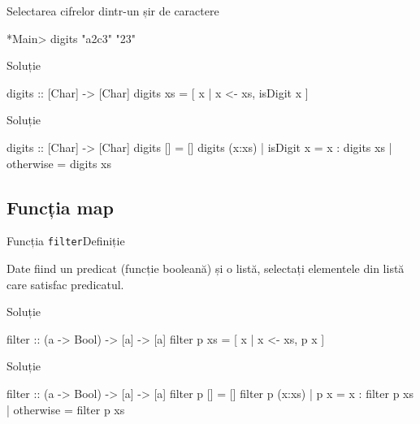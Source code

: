 \documentclass[xcolor=pdftex,romanian,colorlinks]{beamer}
\begin{document}
\begin{frame}[fragile]{Selectarea cifrelor dintr-un șir de caractere}
\begin{block}{}
\begin{asciihs}
*Main> digits "a2c3"
"23"
\end{asciihs}
\end{block}
\begin{block}{Soluție }
\begin{asciihs}
digits :: [Char] -> [Char]
digits xs = [ x | x <- xs, isDigit x ]
\end{asciihs}
\end{block}
\begin{block}{Soluție }
\begin{asciihs}
digits :: [Char] -> [Char]
digits []                 = []
digits (x:xs) | isDigit x = x : digits xs
              | otherwise = digits xs
\end{asciihs}
\end{block}
\end{frame}

\subsection{Funcția map}

\begin{frame}[fragile]{Funcția \lstinline$filter$}{Definiție}
\begin{block}{}
Date fiind un predicat (funcție booleană) și o listă, selectați elementele din listă care satisfac predicatul.
\end{block}
\begin{block}{Soluție }
\begin{asciihs}
filter :: (a -> Bool) -> [a] -> [a]
filter p xs = [ x | x <- xs, p x ]
\end{asciihs}
\end{block}
\begin{block}{Soluție }
\begin{asciihs}
filter :: (a -> Bool) -> [a] -> [a]
filter p []                 = []
filter p (x:xs) | p x       = x : filter p xs
                | otherwise = filter p xs
\end{asciihs}
\end{block}
\end{frame}
\end{document}
